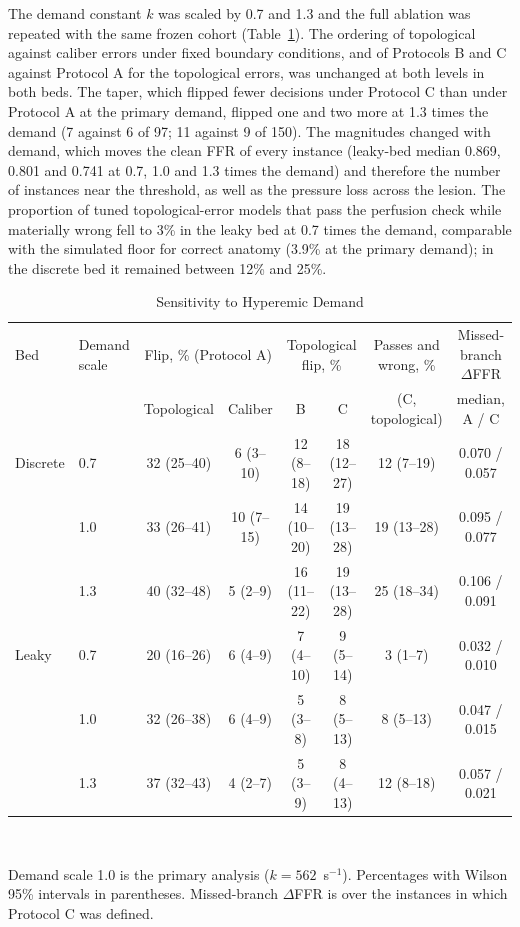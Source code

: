 The demand constant $k$ was scaled by 0.7 and 1.3 and the full ablation was repeated with the same frozen cohort
(Table~\ref{tab:demand}). The ordering of topological against caliber errors under fixed boundary conditions, and of
Protocols B and C against Protocol A for the topological errors, was unchanged at both levels in both beds. The taper,
which flipped fewer decisions under Protocol C than under Protocol A at the primary demand, flipped one and two more
at 1.3 times the demand (7 against 6 of 97; 11 against 9 of 150). The magnitudes changed with demand, which moves the
clean FFR of every instance (leaky-bed median 0.869, 0.801 and 0.741 at 0.7, 1.0 and 1.3 times the demand) and
therefore the number of instances near the threshold, as well as the pressure loss across the lesion. The proportion
of tuned topological-error models that pass the perfusion check while materially wrong fell to 3\% in the leaky bed
at 0.7 times the demand, comparable with the simulated floor for correct anatomy (3.9\% at the primary demand); in
the discrete bed it remained between 12\% and 25\%.
\begin{table}[!h]
\caption{Sensitivity to Hyperemic Demand}\label{tab:demand}
\centering\small
\begin{tabular}{@{}llcccccc@{}}
\toprule
Bed & Demand scale & \multicolumn{2}{c}{Flip, \% (Protocol A)} & \multicolumn{2}{c}{Topological flip, \%} &
Passes and wrong, \% & Missed-branch $\Delta$FFR\\
\cmidrule(lr){3-4}\cmidrule(lr){5-6}
 & & Topological & Caliber & B & C & (C, topological) & median, A / C\\
\midrule
Discrete & 0.7 & 32 (25--40) & 6 (3--10) & 12 (8--18) & 18 (12--27) & 12 (7--19) & 0.070 / 0.057 \\
 & 1.0 & 33 (26--41) & 10 (7--15) & 14 (10--20) & 19 (13--28) & 19 (13--28) & 0.095 / 0.077 \\
 & 1.3 & 40 (32--48) & 5 (2--9) & 16 (11--22) & 19 (13--28) & 25 (18--34) & 0.106 / 0.091 \\
Leaky & 0.7 & 20 (16--26) & 6 (4--9) & 7 (4--10) & 9 (5--14) & 3 (1--7) & 0.032 / 0.010 \\
 & 1.0 & 32 (26--38) & 6 (4--9) & 5 (3--8) & 8 (5--13) & 8 (5--13) & 0.047 / 0.015 \\
 & 1.3 & 37 (32--43) & 4 (2--7) & 5 (3--9) & 8 (4--13) & 12 (8--18) & 0.057 / 0.021 \\
\bottomrule
\end{tabular}
\\[3pt]
\parbox{0.9\textwidth}{\footnotesize Demand scale 1.0 is the primary analysis ($k = 562$~s$^{-1}$). Percentages with Wilson 95\%
intervals in parentheses. Missed-branch $\Delta$FFR is over the instances in which Protocol C was defined.}
\end{table}
